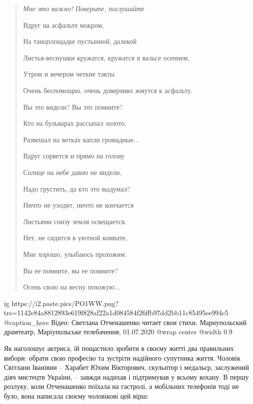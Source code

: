 \begin{quote}
\em
Мне это важно! Поверьте, послушайте\par
Вдруг на асфальте мокром,\par
На танцплощадке пустынной, далекой\par
Листья-веснушки кружатся, кружатся в вальсе осеннем, \par
Утром и вечером четкие такты\par
Очень беспомощно, очень доверчиво жмутся к асфальту.\par
Вы это видели? Вы это помните?\par
Кто на бульварах рассыпал золото,\par
Развешал на ветках капли громадные...\par
Вдруг сорвется и прямо на голову\par
Солнце на небе давно не видели,\par
Надо грустить, да кто это выдумал?\par
Ничто не уходит, ничто не кончается\par
Листьями снизу земля освещается.\par
Нет, не сидится в уютной комнате,\par
Мне хорошо, улыбаюсь прохожим.\par
Вы ее помните, вы ее помните? \par
Осень свою на весну похожую... \par
\end{quote}

\ifcmt
  ig https://i2.paste.pics/PO1WW.png?trs=1142e84a8812893e619f828af22a1d084584f26ffb97dd2bb11c85495ee994c5
	@caption_here Відео: Светлана Отченашенко читает свои стихи. Мариупольский драмтеатр, Маріупольське телебачення, 01.07.2020 
  @wrap center
  @width 0.9
\fi

Як наголошує актриса, їй пощастило зробити в своєму житті два правильних
вибори: обрати свою професію та зустріти надійного супутника життя. Чоловік
Світлани Іванівни – Харабет Юхим Вікторович, скульптор і медальєр, заслужений
діяч мистецтв України, – завжди надихав і підтримував у всьому кохану. В першу
розлуку, коли Отченашенко поїхала на гастролі, а мобільних телефонів тоді не
було, вона написала своєму чоловікові цей вірш:

